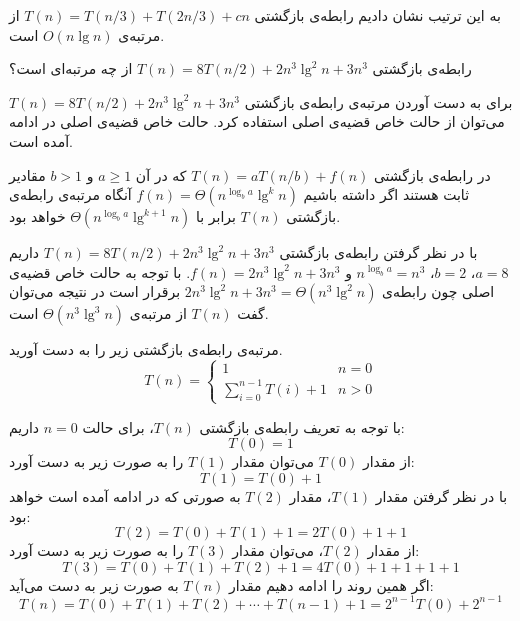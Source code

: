{به این ترتیب نشان دادیم رابطه‌ی بازگشتی {$T(n)=T(n/3)+T(2n/3)+cn$} از مرتبه‌ی {$O(n\lg n)$} است.

 رابطه‌ی بازگشتی {$T(n)=8T(n/2)+2n^3{\lg}^2 n+3n^3$} از چه مرتبه‌ای است؟


برای به دست آوردن مرتبه‌ی رابطه‌ی بازگشتی {$T(n)=8T(n/2)+2n^3{\lg}^2 n+3n^3$} می‌توان از حالت خاص قضیه‌ی اصلی استفاده کرد. حالت خاص قضیه‌ی اصلی در ادامه آمده است.

در رابطه‌ی بازگشتی {$T(n)=aT(n/b)+f(n)$} که در آن {$a\geqslant 1$} و {$b>1$} مقادیر ثابت هستند اگر داشته باشیم
 {$f(n)=\Theta (n^{\log_b a}{\lg}^k n)$} آنگاه مرتبه‌ی رابطه‌ی بازگشتی {$T(n)$} برابر با {$\Theta (n^{\log_b a}{\lg}^{k+1} n)$} خواهد بود.

با در نظر گرفتن رابطه‌ی بازگشتی {$T(n)=8T(n/2)+2n^3{\lg}^2 n+3n^3$} داریم {$a=8$}، {$b=2$}، {$n^{\log_b a}=n^3$} و {$f(n)=2n^3{\lg}^2 n+3n^3$}. با توجه به حالت خاص قضیه‌ی اصلی چون رابطه‌ی {$2n^3{\lg}^2 n+3n^3=\Theta (n^3{\lg}^2 n)$} برقرار است در نتیجه می‌توان گفت {$T(n)$} از مرتبه‌ی {$\Theta (n^3{\lg}^3 n)$} است.

 مرتبه‌ی رابطه‌ی بازگشتی زیر را به دست آورید.
\begin{displaymath}
T(n)=
\begin{cases}
1 & n=0\\
{\displaystyle\sum_{i=0}^{n-1}{T(i)} + 1} & n>0
\end{cases}
\end{displaymath}


با توجه به تعریف رابطه‌ی بازگشتی {$T(n)$}، برای حالت {$n=0$} داریم:
\begin{displaymath}
T(0)=1
\end{displaymath}
از مقدار {$T(0)$} می‌توان مقدار {$T(1)$} را به صورت زیر به دست آورد:
\begin{displaymath}
T(1)=T(0) + 1
\end{displaymath}
با در نظر گرفتن مقدار {$T(1)$}، مقدار {$T(2)$} به صورتی که در ادامه آمده است خواهد بود:
\begin{displaymath}
T(2)=T(0) + T(1) + 1 = 2T(0) + 1 + 1
\end{displaymath}
از مقدار {$T(2)$}، می‌توان مقدار {$T(3)$} را به صورت زیر به دست آورد:
\begin{displaymath}
T(3)=T(0) + T(1) + T(2) + 1 = 4T(0) + 1 + 1 + 1 + 1
\end{displaymath}
اگر همین روند را ادامه دهیم مقدار {$T(n)$} به صورت زیر به دست می‌آید:
\begin{displaymath}
T(n) = T(0) + T(1) + T(2) + \cdots + T(n-1) + 1= 2^{n-1}T(0) + 2^{n-1}
\end{displaymath}

}
